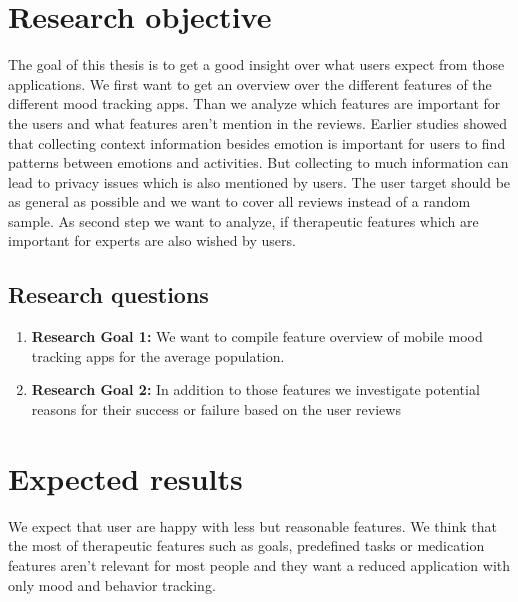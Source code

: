 \section{Research objective}
\label{sec:research-objective}
The goal of this thesis is to get a good insight over what users expect from those applications.
We first want to get an overview over the different features of the different mood tracking apps.
Than we analyze which features are important for the users and what features aren't mention in the reviews. Earlier studies showed that collecting context information besides emotion is important for users to find patterns between emotions and activities\cite{caldeira2017mobile}\cite{schueller2021understanding}\cite{widnall2020user}. But collecting to much information can lead to privacy issues which is also mentioned by users.
The user target should be as general as possible and we want to cover all reviews instead of a random sample.
As second step we want to analyze, if therapeutic features which are important for experts are also wished by users.
\subsection{Research questions}
\label{sec:research-questions}
\begin{enumerate}
\item \textbf{Research Goal 1:}
We want to compile feature overview of mobile mood tracking
apps for the average population.
\item \textbf{Research Goal 2:} In addition to those features we investigate potential reasons
for their success or failure based on the user reviews
\end{enumerate}


\section{Expected results}
\label{sec:expected-results}
We expect that user are happy with less but reasonable features.
We think that the most of therapeutic features such as goals, 
predefined tasks or medication features aren't relevant for most people and they want 
a reduced application with only mood and behavior tracking. 



